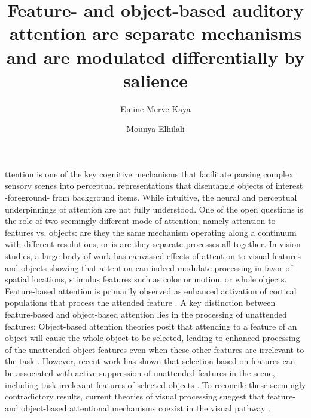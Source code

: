 \documentclass[9pt,twocolumn,twoside]{pnas-new}
\title{Feature- and object-based auditory attention are separate mechanisms and are modulated differentially by salience}
\author[1]{Emine Merve Kaya}
\author[1]{Mounya Elhilali}
\affil[1]{Department of Electrical and Computer Engineering, Johns Hopkins University}
\begin{document}
\verticaladjustment{-2pt}

\maketitle
\thispagestyle{firststyle}

ttention is one of the key cognitive mechanisms that facilitate parsing complex sensory scenes into perceptual representations that disentangle objects of interest -foreground- from background items. While intuitive, the neural and perceptual underpinnings of attention are not fully understood. One of the open questions is the role of two seemingly different mode of attention; namely attention to features vs. objects: are they the same mechanism operating along a continuum with different resolutions, or is are they separate processes all together. In vision studies, a large body of work has canvassed effects of attention to visual features and objects showing that attention can indeed modulate processing in favor of spatial locations, stimulus features such as color or motion, or whole objects. Feature-based attention is primarily observed as enhanced activation of cortical populations that process the attended feature \cite{Treue96a,Saenz02a,Liu11a}. A key distinction between feature-based and object-based attention lies in the processing of unattended features: Object-based attention theories posit that attending to a feature of an object will cause the whole object to be selected, leading to enhanced processing of the unattended object features even when these other features are irrelevant to the task \cite{OCraven99a,Schoenfeld03a,Sohn04a}. However, recent work has shown that selection based on features can be associated with active suppression of unattended features in the scene, including task-irrelevant features of selected objects \cite{Wegener08a,Taya09a,Freeman14a}. To reconcile these seemingly contradictory results, current theories of visual processing suggest that feature- and object-based attentional mechanisms coexist in the visual pathway \cite{Kravitz11a,Mayer12a,Wegener14a,Geigerman16a}.
\end{document}
